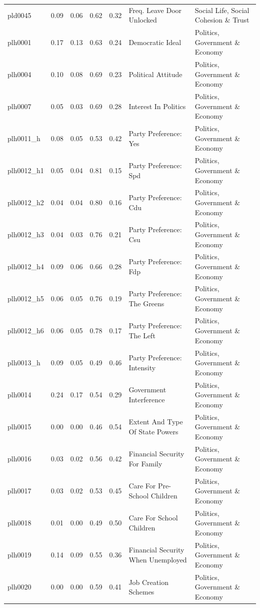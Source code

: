 \documentclass[
  12pt,
]{article}
\begin{document}
\begin{landscape}
\begin{scriptsize}
\begin{longtable}{|p{1.75in}|p{0.3in}|p{0.3in}|p{0.3in}|p{0.3in}|p{2.5in}|p{2.5in}}
pld0045 & 0.09 & 0.06 & 0.62 & 0.32 & Freq. Leave Door Unlocked & Social Life, Social Cohesion \& Trust \\ 
plh0001 & 0.17 & 0.13 & 0.63 & 0.24 & Democratic Ideal & Politics, Government \& Economy \\ 
plh0004 & 0.10 & 0.08 & 0.69 & 0.23 & Political Attitude & Politics, Government \& Economy \\ 
plh0007 & 0.05 & 0.03 & 0.69 & 0.28 & Interest In Politics & Politics, Government \& Economy \\ 
plh0011\_h & 0.08 & 0.05 & 0.53 & 0.42 & Party Preference: Yes & Politics, Government \& Economy \\ 
plh0012\_h1 & 0.05 & 0.04 & 0.81 & 0.15 & Party Preference: Spd & Politics, Government \& Economy \\ 
plh0012\_h2 & 0.04 & 0.04 & 0.80 & 0.16 & Party Preference: Cdu & Politics, Government \& Economy \\ 
plh0012\_h3 & 0.04 & 0.03 & 0.76 & 0.21 & Party Preference: Csu & Politics, Government \& Economy \\ 
plh0012\_h4 & 0.09 & 0.06 & 0.66 & 0.28 & Party Preference: Fdp & Politics, Government \& Economy \\ 
plh0012\_h5 & 0.06 & 0.05 & 0.76 & 0.19 & Party Preference: The Greens & Politics, Government \& Economy \\ 
plh0012\_h6 & 0.06 & 0.05 & 0.78 & 0.17 & Party Preference: The Left & Politics, Government \& Economy \\ 
plh0013\_h & 0.09 & 0.05 & 0.49 & 0.46 & Party Preference: Intensity & Politics, Government \& Economy \\ 
plh0014 & 0.24 & 0.17 & 0.54 & 0.29 & Government Interference & Politics, Government \& Economy \\ 
plh0015 & 0.00 & 0.00 & 0.46 & 0.54 & Extent And Type Of State Powers & Politics, Government \& Economy \\ 
plh0016 & 0.03 & 0.02 & 0.56 & 0.42 & Financial Security For Family & Politics, Government \& Economy \\ 
plh0017 & 0.03 & 0.02 & 0.53 & 0.45 & Care For Pre-School Children & Politics, Government \& Economy \\ 
plh0018 & 0.01 & 0.00 & 0.49 & 0.50 & Care For School Children & Politics, Government \& Economy \\ 
plh0019 & 0.14 & 0.09 & 0.55 & 0.36 & Financial Security When Unemployed & Politics, Government \& Economy \\ 
plh0020 & 0.00 & 0.00 & 0.59 & 0.41 & Job Creation Schemes & Politics, Government \& Economy \\ 

\end{longtable}
\end{scriptsize}
\end{landscape}
\end{document}
